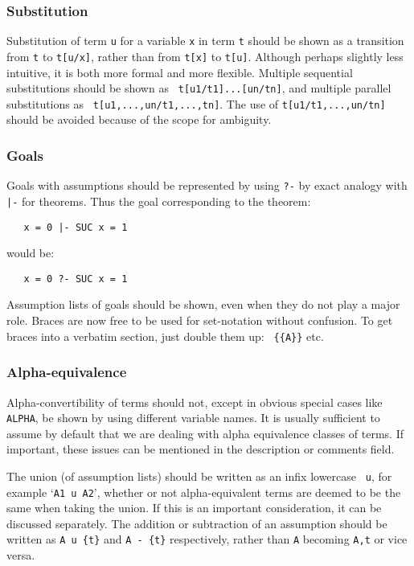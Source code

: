 \subsubsection{Substitution}

Substitution of term {\tt u} for a variable {\tt x} in term {\tt t} should be
shown as a transition from {\tt t} to {\tt t[u/x]}, rather than from {\tt t[x]}
to {\tt t[u]}. Although perhaps slightly less intuitive, it is both more formal
and more flexible. Multiple sequential substitutions should be shown as {\tt
t[u1/t1]...[un/tn]}, and multiple parallel substitutions as {\tt
t[u1,...,un/t1,...,tn]}. The use of {\tt t[u1/t1,...,un/tn]} should be avoided
because of the scope for ambiguity.

\subsubsection{Goals}

Goals with assumptions should be represented by using {\tt ?-} by exact analogy
with {\tt |-} for theorems. Thus the goal corresponding to the theorem:

\begin{verbatim}
   x = 0 |- SUC x = 1
\end{verbatim}

\noindent would be:

\begin{verbatim}
   x = 0 ?- SUC x = 1
\end{verbatim}

\noindent Assumption lists of goals should be shown, even when they do not play
a major role. Braces are now free to be used for set-notation without
confusion. To get braces into a verbatim section, just double them up: {\tt
\{\{A\}\}} etc.

\subsubsection{Alpha-equivalence}

Alpha-convertibility of terms should not, except in obvious special cases like
{\tt ALPHA}, be shown by using different variable names. It is usually
sufficient to assume by default that we are dealing with alpha equivalence
classes of terms. If important, these issues can be mentioned in the
description or comments field.

The union (of assumption lists) should be written as an infix lowercase {\tt
u}, for example `{\tt A1 u A2}', whether or not alpha-equivalent terms are
deemed to be the same when taking the union.  If this is an important
consideration, it can be discussed separately.  The addition or subtraction of
an assumption should be written as {\tt A u \{t\}} and {\tt A - \{t\}}
respectively, rather than {\tt A} becoming {\tt A,t} or vice versa.

